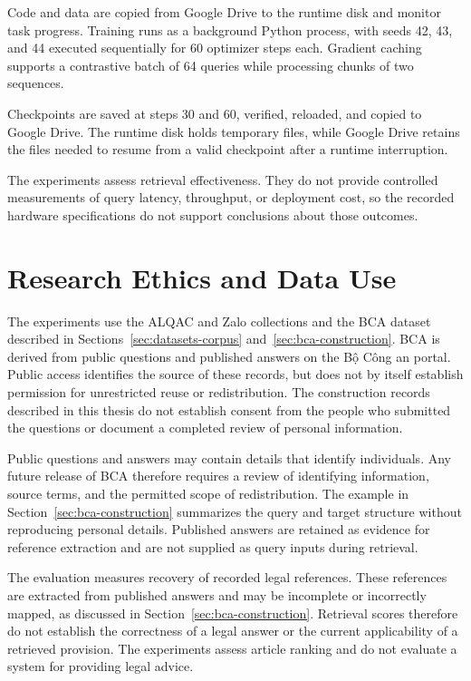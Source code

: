 Code and data are copied from Google Drive to the runtime disk and monitor task progress. Training runs as a background Python process, with seeds 42, 43, and 44 executed sequentially for 60 optimizer steps each. Gradient caching supports a contrastive batch of 64 queries while processing chunks of two sequences. 

Checkpoints are saved at steps 30 and 60, verified, reloaded, and copied to Google Drive. The runtime disk holds temporary files, while Google Drive retains the files needed to resume from a valid checkpoint after a runtime interruption.



The experiments assess retrieval effectiveness. They do not provide controlled measurements of query latency, throughput, or deployment cost, so the recorded hardware specifications do not support conclusions about those outcomes.

\section{Research Ethics and Data Use}
\label{sec:ethics-data}

The experiments use the ALQAC and Zalo collections and the BCA dataset described in Sections~\ref{sec:datasets-corpus} and~\ref{sec:bca-construction}. BCA is derived from public questions and published answers on the Bộ Công an portal. Public access identifies the source of these records, but does not by itself establish permission for unrestricted reuse or redistribution. The construction records described in this thesis do not establish consent from the people who submitted the questions or document a completed review of personal information.

Public questions and answers may contain details that identify individuals. Any future release of BCA therefore requires a review of identifying information, source terms, and the permitted scope of redistribution. The example in Section~\ref{sec:bca-construction} summarizes the query and target structure without reproducing personal details. Published answers are retained as evidence for reference extraction and are not supplied as query inputs during retrieval.

The evaluation measures recovery of recorded legal references. These references are extracted from published answers and may be incomplete or incorrectly mapped, as discussed in Section~\ref{sec:bca-construction}. Retrieval scores therefore do not establish the correctness of a legal answer or the current applicability of a retrieved provision. The experiments assess article ranking and do not evaluate a system for providing legal advice.

